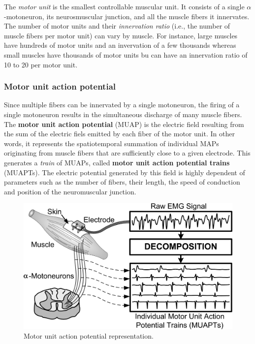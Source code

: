 \documentclass[a4paper,12pt,twoside,openright,oldfontcommands]{memoir}
\begin{document}
The \emph{motor unit} is the smallest controllable muscular unit. It
consists of a single \(\alpha\)-motoneuron, its neurosmuscular junction,
and all the muscle fibers it innervates. The number of motor units and
their \emph{innervation ratio} (i.e., the number of muscle fibers per
motor unit) can vary by muscle. For instance, large muscles have
hundreds of motor units and an invervation of a few thousands whereas
small muscles have thousands of motor units bu can have an innervation
ratio of 10 to 20 per motor unit.

\subsubsection{Motor unit action
potential}\label{motor-unit-action-potential}

Since multiple fibers can be innervated by a single motoneuron, the
firing of a single motoneuron results in the simultaneous discharge of
many muscle fibers. The \textbf{motor unit action potential} (MUAP) is
the electric field resulting from the sum of the electric fiels emitted
by each fiber of the motor unit. In other words, it represents the
spatiotemporal summation of individual MAPs originating from muscle
fibers that are sufficiently close to a given electrode. This generates
a \emph{train} of MUAPs, called \textbf{motor unit action potential
trains} (MUAPTs). The electric potential generated by this field is
highly dependent of parameters such as the number of fibers, their
length, the speed of conduction and position of the neuromuscular
junction.

\begin{figure}[H]

{\centering \includegraphics[width=0.75\linewidth]{assets/muap} 

}

\caption{Motor unit action potential representation.}\label{fig:muap}
\end{figure}
\end{document}
